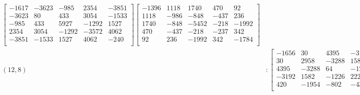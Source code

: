 \documentclass[12pt]{amsart}
\theoremstyle{plain}
\theoremstyle{definition}
\begin{document}
\begin{landscape}
\begin{align*}
\begin{bmatrix}
-1617  &   -3623  &   -985  &   2354  &   -3851  \\ 
 -3623  &   80  &   433  &   3054  &   -1533  \\ 
 -985  &   433  &   5927  &   -1292  &   1527  \\ 
 2354  &   3054  &   -1292  &   -3572  &   4062  \\ 
 -3851  &   -1533  &   1527  &   4062  &   -240  \\ 
\end{bmatrix}
\begin{bmatrix}
-1396  &   1118  &   1740  &   470  &   92  \\ 
 1118  &   -986  &   -848  &   -437  &   236  \\ 
 1740  &   -848  &   -5452  &   -218  &   -1992  \\ 
 470  &   -437  &   -218  &   -237  &   342  \\ 
 92  &   236  &   -1992  &   342  &   -1784  \\ 
\end{bmatrix}
\\
(12,8) &:
\begin{bmatrix}
-1656  &   30  &   4395  &   -3192  &   420  \\ 
 30  &   2958  &   -3288  &   1582  &   -1954  \\ 
 4395  &   -3288  &   64  &   -1226  &   -802  \\ 
 -3192  &   1582  &   -1226  &   2227  &   -439  \\ 
 420  &   -1954  &   -802  &   -439  &   -75  \\ 
\end{bmatrix}
\begin{bmatrix}
-7336  &   -2605  &   -3052  &   -2963  &   6220  \\ 
 -2605  &   3529  &   -994  &   2557  &   -1609  \\ 
 -3052  &   -994  &   1212  &   -3149  &   2608  \\ 
 -2963  &   2557  &   -3149  &   -1075  &   374  \\ 
 6220  &   -1609  &   2608  &   374  &   -2392  \\ 
\end{bmatrix}
\begin{bmatrix}
-944  &   -2009  &   4281  &   -1237  &   301  \\ 
 -2009  &   3109  &   328  &   -552  &   -1994  \\ 
 4281  &   328  &   -2289  &   1298  &   271  \\ 
 -1237  &   -552  &   1298  &   -716  &   -372  \\ 

\end{bmatrix}
\end{align*}
\end{landscape}
\end{document}
